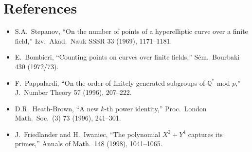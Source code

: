 \documentclass[12pt]{amsart}
\theoremstyle{definition}
\theoremstyle{remark}
\begin{document}
\section*{References}

\begin{itemize}
\item[{[Step69]}] S.A.\ Stepanov, ``On the number of points of a hyperelliptic curve over a finite field,'' Izv.\ Akad.\ Nauk SSSR 33 (1969), 1171--1181.
\item[{[B73]}] E.\ Bombieri, ``Counting points on curves over finite fields,'' S\'em.\ Bourbaki 430 (1972/73).
\item[{[P96]}] F.\ Pappalardi, ``On the order of finitely generated subgroups of $\mathbb{Q}^*$ mod $p$,'' J.\ Number Theory 57 (1996), 207--222.
\item[{[HB96]}] D.R.\ Heath-Brown, ``A new $k$-th power identity,'' Proc.\ London Math.\ Soc.\ (3) 73 (1996), 241--301.
\item[{[FI98]}] J.\ Friedlander and H.\ Iwaniec, ``The polynomial $X^2 + Y^4$ captures its primes,'' Annals of Math.\ 148 (1998), 1041--1065.
\end{itemize}
\end{document}
